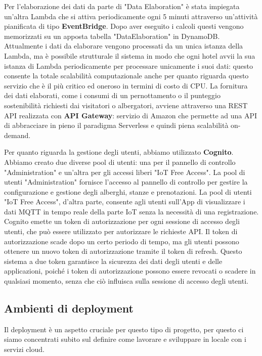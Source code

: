 Per l'elaborazione dei dati da parte di "Data Elaboration" è stata impiegata un'altra Lambda che si attiva periodicamente ogni 5 minuti attraverso un'attività pianificata di tipo \textbf{EventBridge}. Dopo aver eseguito i calcoli questi vengono memorizzati su un apposta tabella "DataElaboration" in DynamoDB.
Attualmente i dati da elaborare vengono processati da un unica istanza della Lambda, ma è possibile strutturale il sistema in modo che ogni hotel avvii la sua istanza di Lambda periodicamente per processare unicamente i suoi dati: questo consente la totale scalabilità computazionale anche per quanto riguarda questo servizio che è il più critico ed oneroso in termini di costo di CPU.
La fornitura dei dati elaborati, come i consumi di un pernottamento o il punteggio sostenibilità richiesti dai visitatori o albergatori, avviene attraverso una REST API realizzata con \textbf{API Gateway}: servizio di Amazon che permette ad una API di abbracciare in pieno il paradigma Serverless e quindi piena scalabilità on-demand.

Per quanto riguarda la gestione degli utenti, abbiamo utilizzato \textbf{Cognito}. Abbiamo creato due diverse pool di utenti: una per il pannello di controllo "Administration" e un'altra per gli accessi liberi "IoT Free Access". La pool di utenti "Administration" fornisce l'accesso al pannello di controllo per gestire la configurazione e gestione degli alberghi, stanze e prenotazioni. La pool di utenti "IoT Free Access", d'altra parte, consente agli utenti sull'App di visualizzare i dati MQTT in tempo reale della parte IoT senza la necessità di una registrazione.
Cognito emette un token di autorizzazione per ogni sessione di accesso degli utenti, che può essere utilizzato per autorizzare le richieste API. Il token di autorizzazione scade dopo un certo periodo di tempo, ma gli utenti possono ottenere un nuovo token di autorizzazione tramite il token di refresh. Questo sistema a due token garantisce la sicurezza dei dati degli utenti e delle applicazioni, poiché i token di autorizzazione possono essere revocati o scadere in qualsiasi momento, senza che ciò influisca sulla sessione di accesso degli utenti. 

\subsection{Ambienti di deployment}

Il deployment è un aspetto cruciale per questo tipo di progetto, per questo ci siamo concentrati subito sul definire come lavorare e sviluppare in locale con i servizi cloud.

